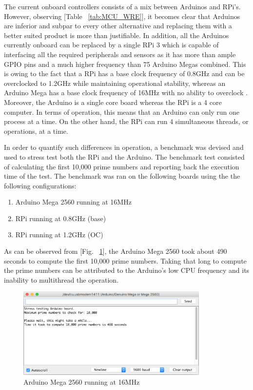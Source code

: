 \indent\indent The current onboard controllers consists of a mix between Arduinos and RPi’s. However, observing [Table ~\ref{tab:MCU_WRE}], it becomes clear that Arduinos are inferior and subpar to every other alternative and replacing them with a better suited product is more than justifiable. In addition, all the Arduinos currently onboard can be replaced by a single RPi 3 which is capable of interfacing all the required peripherals and sensors as it has more than ample GPIO pins and a much higher frequency than 75 Arduino Megas combined. This is owing to the fact that a RPi has a base clock frequency of 0.8GHz and can be overclocked to 1.2GHz while maintaining operational stability, whereas an Arduino Mega has a base clock frequency of 16MHz with no ability to overclock \cite{Arduino_Specs}. Moreover, the Arduino is a single core board whereas the RPi is a 4 core computer. In terms of operation, this means that an Arduino can only run one process at a time. On the other hand, the RPi can run 4 simultaneous threads, or operations, at a time.

In order to quantify such differences in operation, a benchmark was devised and used to stress test both the RPi and the Arduino. The benchmark test consisted of calculating the first 10,000 prime numbers and reporting back the execution time of the test. The benchmark was ran on the following boards using the the following configurations:

\begin{enumerate}
    \item Arduino Mega 2560 running at 16MHz
    \item RPi running at 0.8GHz (base)
    \item RPi running at 1.2GHz (OC)
\end{enumerate}

As can be observed from [Fig. ~\ref{fig:Arduino_bench}], the Arduino Mega 2560 took about 490 seconds to compute the first 10,000 prime numbers. Taking that long to compute the prime numbers can be attributed to the Arduino's low CPU frequency and its inability to multithread the operation.

\begin{figure}[H]
  \centering
  \includegraphics[width=0.85\textwidth]{Controls/Arduino_bench.png}
  \caption{\label{fig:Arduino_bench}Arduino Mega 2560 running at 16MHz}
\end{figure}

